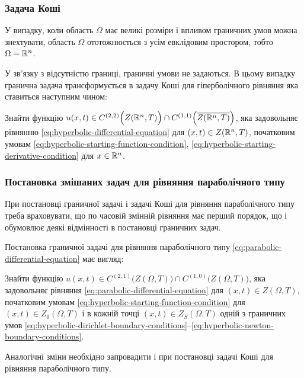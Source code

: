 \subsubsection{Задача Коші}

У випадку, коли область $\Omega$ має великі розміри і впливом граничних умов можна знехтувати, область $\Omega$ ототожнюється з усім евклідовим простором, тобто $\Omega = \mathbb{R}^n$. \medskip

У зв'язку з відсутністю границі, граничні умови не задаються. В цьому випадку гранична задача трансформується в задачу Коші для гіперболічного рівняння яка ставиться наступним чином: 
\begin{problem_formulation*}
    Знайти функцію $u(x, t) \in C^{(2, 2)} \Big( Z(\mathbb{R}^n, T) \Big) \cap C^{(1, 1)} \Big( \overline {Z(\mathbb{R}^n, T)} \Big)$, яка задовольняє рівнянню \eqref{eq:hyperbolic-differential-equation} для $(x, t) \in Z(\mathbb{R}^n, T)$, початковим умовам \eqref{eq:hyperbolic-starting-function-condition}, \eqref{eq:hyperbolic-starting-derivative-condition} для $x \in \mathbb{R}^n$.
\end{problem_formulation*}

\subsubsection{Постановка змішаних задач для рівняння параболічного типу}

При постановці граничної задачі і задачі Коші для рівняння параболічного типу треба враховувати, що по часовій змінній рівняння має перший порядок, що і обумовлює деякі відмінності в постановці граничних задач. \medskip

Постановка граничної задачі для рівняння параболічного типу \eqref{eq:parabolic-differential-equation} має вигляд:
\begin{problem_formulation*}
    Знайти функцію $u(x, t) \in C^{(2, 1)} \Big( Z(\Omega, T) \Big) \cap C^{(1, 0)} \Big( \overline {Z(\Omega, T)} \Big)$, яка задовольняє рівняння \eqref{eq:parabolic-differential-equation} для $(x, t) \in Z(\Omega, T)$, початковим умовам \eqref{eq:hyperbolic-starting-function-condition} для $(x, t) \in Z_0(\Omega, T)$ і в кожній точці $(x, t) \in Z_S(\Omega, T)$ одній з граничних умов \eqref{eq:hyperbolic-dirichlet-boundary-conditions}--\eqref{eq:hyperbolic-newton-boundary-conditions}. \end{problem_formulation*}

Аналогічні зміни необхідно запровадити і при постановці задачі Коші для рівняння параболічного типу.

